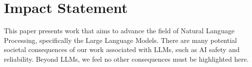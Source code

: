 \section*{Impact Statement}
This paper presents work that aims to advance the field of Natural Language Processing, specifically the Large Language Models. There are many potential societal consequences of our work associated with LLMs, such as AI safety and reliability. Beyond LLMs, we feel no other consequences must be highlighted here. 